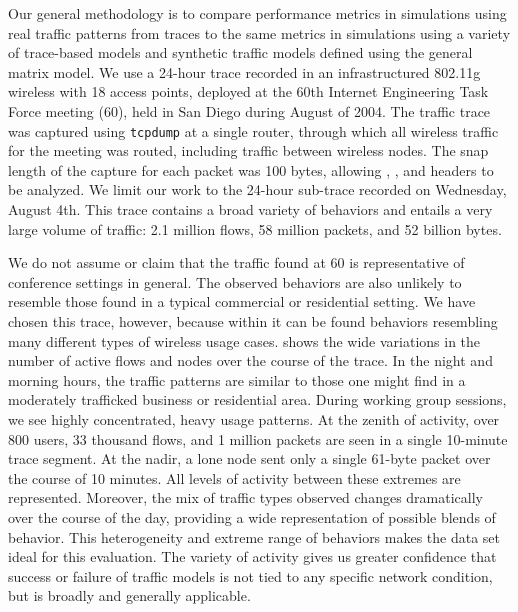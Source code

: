 \documentclass[twocolumn,final]{svjour3}
\begin{document}
Our general methodology is to compare performance metrics in simulations using real traffic patterns from traces to the same metrics in simulations using a variety of trace-based models and synthetic traffic models defined using the general matrix model. We use a 24-hour trace recorded in an infrastructured 802.11g wireless  with 18 access points, deployed at the 60th Internet Engineering Task Force meeting (60), held in San Diego during August of 2004. The traffic trace was captured using \texttt{\small{tcpdump}} at a single router, through which all wireless traffic for the meeting was routed, including traffic between wireless nodes. The snap length of the capture for each packet was 100 bytes, allowing , ,  and  headers to be analyzed. We limit our work to the 24-hour sub-trace recorded on Wednesday, August 4th. This trace contains a broad variety of behaviors and entails a very large volume of traffic: 2.1 million flows, 58 million packets, and 52 billion bytes.



We do not assume or claim that the traffic found at 60 is representative of conference settings in general. The observed behaviors are also unlikely to resemble those found in a typical commercial or residential setting. We have chosen this trace, however, because within it can be found behaviors resembling many different types of wireless usage cases.  shows the wide variations in the number of active flows and nodes over the course of the trace. In the night and morning hours, the traffic patterns are similar to those one might find in a moderately trafficked business or residential area. During working group sessions, we see highly concentrated, heavy usage patterns. At the zenith of activity, over 800 users, 33 thousand flows, and 1 million packets are seen in a single 10-minute trace segment. At the nadir, a lone node sent only a single 61-byte packet over the course of 10 minutes. All levels of activity between these extremes are represented. Moreover, the mix of traffic types observed changes dramatically over the course of the day, providing a wide representation of possible blends of behavior. This heterogeneity and extreme range of behaviors makes the  data set ideal for this evaluation. The variety of activity gives us greater confidence that success or failure of traffic models is not tied to any specific network condition, but is broadly and generally applicable. %
\end{document}
